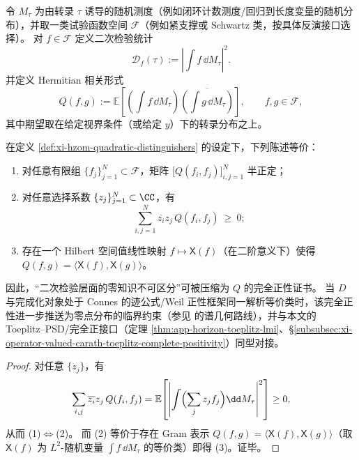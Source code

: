 \begin{definition}[二次检验区分器与相关形式]\label{def:xi-hzom-quadratic-distinguishers}
令 \(M_{\tau}\) 为由转录 \(\tau\) 诱导的随机测度（例如闭环计数测度/回归到长度变量的随机分布），并取一类试验函数空间 \(\mathcal{F}\)（例如紧支撑或 Schwartz 类，按具体反演接口选择）。
对 \(f\in\mathcal{F}\) 定义二次检验统计
\[
\mathcal{D}_{f}(\tau):=\left|\int f\,\dd M_{\tau}\right|^{2}.
\]
并定义 Hermitian 相关形式
\[
Q(f,g):=\mathbb{E}\!\left[\left(\int f\,\dd M_{\tau}\right)\overline{\left(\int g\,\dd M_{\tau}\right)}\right],
\qquad f,g\in\mathcal{F},
\]
其中期望取在给定视界条件（或给定 \(y\)）下的转录分布之上。
\end{definition}

\begin{proposition}\label{prop:xi-hzom-weil-positivity-cp}
在定义 \ref{def:xi-hzom-quadratic-distinguishers} 的设定下，下列陈述等价：
\begin{enumerate}
  \item 对任意有限组 \(\{f_j\}_{j=1}^{N}\subset\mathcal{F}\)，矩阵 \(\bigl[Q(f_i,f_j)\bigr]_{i,j=1}^{N}\) 半正定；
  \item 对任意选择系数 \(\{z_j\}_{j=1}^{N}\subset\CC\)，有
  \[
  \sum_{i,j=1}^{N}\overline{z_i}z_j\,Q(f_i,f_j)\ \ge\ 0;
  \]
  \item 存在一个 Hilbert 空间值线性映射 \(f\mapsto \mathsf{X}(f)\)（在二阶意义下）使得 \(Q(f,g)=\langle \mathsf{X}(f),\mathsf{X}(g)\rangle\)。
\end{enumerate}
因此，“二次检验层面的零知识不可区分”可被压缩为 \(Q\) 的完全正性证书。
当 \(D\) 与完成化对象处于 Connes 的迹公式/Weil 正性框架同一解析等价类时，该完全正性进一步推送为零点分布的临界约束（参见 \cite{Connes1999TraceFormulaNCG} 的谱几何路线），并与本文的 Toeplitz--PSD/完全正接口（定理 \ref{thm:app-horizon-toeplitz-lmi}、\S\ref{subsubsec:xi-operator-valued-carath-toeplitz-complete-positivity}）同型对接。
\end{proposition}

\begin{proof}
对任意 \(\{z_j\}\)，有
\[
\sum_{i,j}\overline{z_i}z_j\,Q(f_i,f_j)
=
\mathbb{E}\!\left[\left|\int \Bigl(\sum_j z_j f_j\Bigr)\dd M_{\tau}\right|^{2}\right]\ge 0,
\]
从而 (1)\(\Leftrightarrow\)(2)。
而 (2) 等价于存在 Gram 表示 \(Q(f,g)=\langle \mathsf{X}(f),\mathsf{X}(g)\rangle\)（取 \(\mathsf{X}(f)\) 为 \(L^2\)-随机变量 \(\int f\,\dd M_{\tau}\) 的等价类）即得 (3)。证毕。
\end{proof}

